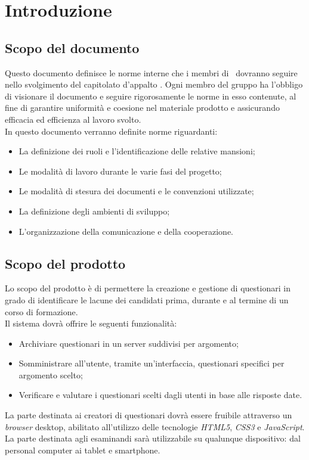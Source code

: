 \newpage
\section{Introduzione}

\subsection{Scopo del documento}
Questo documento definisce le norme interne che i membri di \gruppo\ dovranno seguire nello svolgimento del capitolato d'appalto \progetto. Ogni membro del gruppo ha l'obbligo di visionare il documento e seguire rigorosamente le norme in esso contenute, al fine di garantire uniformità e coesione nel materiale prodotto e assicurando efficacia ed efficienza al lavoro svolto.
\\In questo documento verranno definite norme riguardanti:
\begin{itemize}
\item
La definizione dei ruoli e l'identificazione delle relative mansioni;	
\item
Le modalità di lavoro durante le varie fasi del progetto;
\item
Le modalità di stesura dei documenti e le convenzioni utilizzate;
\item
La definizione degli ambienti di sviluppo;
\item
L'organizzazione della comunicazione e della cooperazione.
\end{itemize}

\subsection{Scopo del prodotto}
Lo scopo del prodotto è di permettere la creazione e gestione di questionari in grado di identificare le lacune dei candidati prima, durante e al termine di un corso di formazione. 
\\Il sistema dovrà offrire le seguenti funzionalità:
\begin{itemize}
\item
Archiviare questionari in un server suddivisi per argomento;
\item
Somministrare all'utente, tramite un'interfaccia, questionari specifici per argomento scelto;
\item
Verificare e valutare i questionari scelti dagli utenti in base alle risposte date.
\end{itemize}
La parte destinata ai creatori di questionari dovrà essere fruibile attraverso un \textit{browser} desktop, abilitato all'utilizzo delle tecnologie \textit{HTML5}, \textit{CSS3} e \textit{JavaScript}. La parte destinata agli esaminandi sarà utilizzabile su qualunque dispositivo: dal personal computer ai tablet e smartphone.


